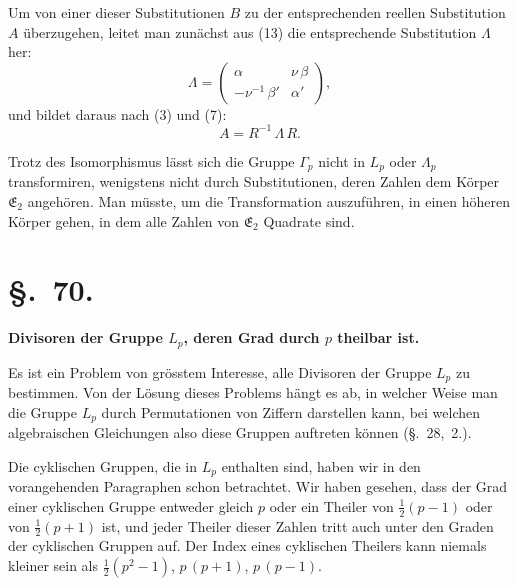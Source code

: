 \documentclass[12pt,a4paper]{article}
\newcommand{\sect}[1]{\section*{{\S.~#1.}}\addcontentsline{toc}{section}{\S.~#1}}
\begin{document}
Um von einer dieser Substitutionen $B$ zu der entsprechenden reellen Substitution $A$ überzugehen, leitet man zunächst aus (13) die entsprechende Substitution $\varLambda$ her:
\begin{equation}\label{eq:69.14}
\tag{14}
\varLambda = \begin{pmatrix}\alpha&\nu\,\beta\\-\nu^{-1}\,\beta'&\alpha'\end{pmatrix},
\end{equation}
und bildet daraus nach (3) und (7):
\begin{equation}\label{eq:69.15}
\tag{15}
A = R^{-1}\,\varLambda\,R.
\end{equation}

Trotz des Isomorphismus lässt sich die Gruppe $\varGamma_{p}$ nicht in $L_{p}$ oder $\varLambda_{p}$ transformiren, wenigstens nicht durch Substitutionen, deren Zahlen dem Körper $\mathfrak{E}_{2}$ angehören. Man müsste, um die Transformation auszuführen, in einen höheren Körper gehen, in dem alle Zahlen von $\mathfrak{E}_{2}$ Quadrate sind.



\newpage
\sect{70}
\begin{center}
\textbf{Divisoren der Gruppe $L_{p}$, deren Grad durch $p$ theilbar ist.}
\end{center}
\label{sec:70}

Es ist ein Problem von grösstem Interesse, alle Divisoren der Gruppe $L_{p}$ zu bestimmen. Von der Lösung dieses Problems hängt es ab, in welcher Weise man die Gruppe $L_{p}$ durch Permutationen von Ziffern darstellen kann, bei welchen algebraischen Gleichungen also diese Gruppen auftreten können (\S.~28,~2.).

Die cyklischen Gruppen, die in $L_{p}$ enthalten sind, haben wir in den vorangehenden Paragraphen schon betrachtet. Wir haben gesehen, dass der Grad einer cyklischen Gruppe entweder gleich $p$ oder ein Theiler von $\frac{1}{2}(p-1)$ oder von $\frac{1}{2}(p+1)$ ist, und jeder Theiler dieser Zahlen tritt auch unter den Graden der cyklischen Gruppen auf. Der Index eines cyklischen Theilers kann niemals kleiner sein als $\frac{1}{2}(p^{2}-1)$, $p\,(p+1)$, $p\,(p-1)$.
\end{document}
